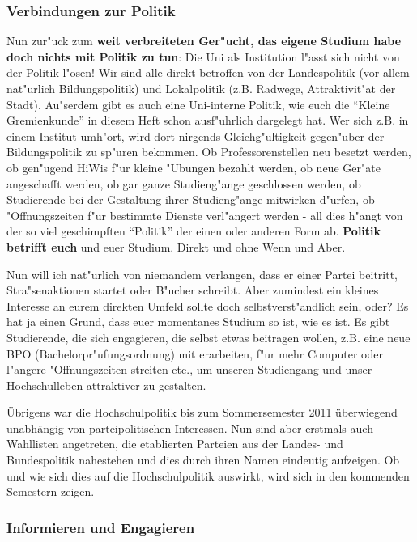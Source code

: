 \begin{multicols}{2}
\subsubsection*{Verbindungen zur Politik}

Nun zur"uck zum \textbf{weit verbreiteten Ger"ucht, das eigene Studium habe 
doch nichts mit Politik zu tun}: Die Uni als Institution l"asst sich nicht von 
der Politik l"osen! Wir sind alle direkt betroffen von der Landespolitik (vor 
allem nat"urlich Bildungspolitik) und Lokalpolitik (z.B. Radwege, 
Attraktivit"at der Stadt). Au"serdem gibt es auch eine Uni-interne Politik, wie 
euch die "`Kleine Gremienkunde"' in diesem Heft schon ausf"uhrlich dargelegt 
hat. Wer sich z.B. in einem Institut umh"ort, wird dort nirgends 
Gleichg"ultigkeit gegen"uber der Bildungspolitik zu sp"uren bekommen. Ob 
Professorenstellen neu besetzt werden, ob gen"ugend HiWis f"ur kleine "Ubungen 
bezahlt werden, ob neue Ger"ate angeschafft werden, ob gar ganze Studieng"ange 
geschlossen werden, ob Studierende bei der Gestaltung ihrer Studieng"ange 
mitwirken d"urfen, ob "Offnungszeiten f"ur bestimmte Dienste verl"angert werden 
- all dies h"angt von der so viel geschimpften "`Politik"' der einen oder 
anderen Form ab. \textbf{Politik betrifft euch} und euer Studium. Direkt und 
ohne Wenn und Aber.

Nun will ich nat"urlich von niemandem verlangen, dass er einer Partei beitritt, 
Stra"senaktionen startet oder B"ucher schreibt. Aber zumindest ein kleines 
Interesse an eurem direkten Umfeld sollte doch selbstverst"andlich sein, oder? 
Es hat ja einen Grund, dass euer momentanes Studium so ist, wie es ist. Es gibt 
Studierende, die sich engagieren, die selbst etwas beitragen wollen, z.B. eine 
neue BPO (Bachelorpr"ufungsordnung) mit erarbeiten, f"ur mehr Computer oder 
l"angere "Offnungszeiten streiten etc., um unseren Studiengang und unser 
Hochschulleben attraktiver zu gestalten.

Übrigens war die Hochschulpolitik bis zum Sommersemester 2011 überwiegend 
unabhängig von parteipolitischen Interessen. Nun sind aber erstmals auch 
Wahllisten angetreten, die etablierten Parteien aus der Landes- und Bundespolitik
nahestehen und dies durch ihren Namen eindeutig aufzeigen. Ob und wie sich dies auf die 
Hochschulpolitik auswirkt, wird sich in den kommenden Semestern zeigen.

\subsubsection*{Informieren und Engagieren}


\end{multicols}
